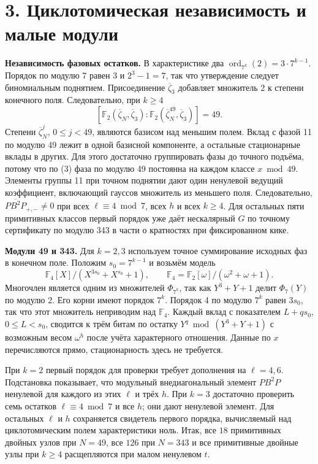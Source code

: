 \documentclass[11pt,a4paper]{article}
\newcommand{\sect}[1]{\section*{\sffamily\color{ink}#1}}
\newcommand{\subt}[1]{\par\medskip\noindent\textbf{#1.}\quad}
\newcommand{\ord}{\operatorname{ord}}
\begin{document}
\newpage
\sect{3. Циклотомическая независимость и малые модули}
\subt{Независимость фазовых остатков}
В характеристике два \(\ord_{7^k}(2)=3\cdot7^{k-1}\). Порядок по модулю 7 равен 3 и \(2^3-1=7\), так что утверждение следует биномиальным поднятием. Присоединение \(\overline\zeta_3\) добавляет множитель 2 к степени конечного поля. Следовательно, при \(k\ge4\)
\[
  [\mathbb F_2(\overline\zeta_N,\overline\zeta_3):
       \mathbb F_2(\overline\zeta_N^{49},\overline\zeta_3)]=49 .
\]
Степени \(\overline\zeta_N^j\), \(0\le j<49\), являются базисом над меньшим полем. Вклад с фазой 11 по модулю 49 лежит в одной базисной компоненте, а остальные стационарные вклады в других. Для этого достаточно группировать фазы до точного подъёма, потому что по (3) фаза по модулю 49 постоянна на каждом классе \(x\bmod49\). Элементы группы 11 при точном поднятии дают один ненулевой ведущий коэффициент, включающий гауссов множитель из меньшего поля. Следовательно, \(\overline{PB^2P}_{+,-}\ne0\) при всех \(\ell\equiv4\bmod7\), всех \(h\) и всех \(k\ge4\). Для остальных пяти примитивных классов первый порядок уже даёт нескалярный \(G\) по точному сертификату по модулю 343 в части о кратностях при фиксированном кике.

\subt{Модули 49 и 343}
Для \(k=2,3\) используем точное суммирование исходных фаз в конечном поле. Положим \(s_0=7^{k-1}\) и возьмём модель
\[
  \mathbb F_4[X]/(X^{3s_0}+X^{s_0}+1),\qquad
  \mathbb F_4=\mathbb F_2[\omega]/(\omega^2+\omega+1).
\]
Многочлен является одним из множителей \(\Phi_{7^k}\), так как \(Y^3+Y+1\) делит \(\Phi_7(Y)\) по модулю 2. Его корни имеют порядок \(7^k\). Порядок 4 по модулю \(7^k\) равен \(3s_0\), так что этот множитель неприводим над \(\mathbb F_4\). Каждый вклад с показателем \(L+q s_0\), \(0\le L<s_0\), сводится к трём битам по остатку \(Y^q\bmod(Y^3+Y+1)\) с возможным весом \(\omega^h\) после учёта характерного отношения. Данные по \(x\) перечисляются прямо, стационарность здесь не требуется.

При \(k=2\) первый порядок для проверки требует дополнения на \(\ell=4,6\). Подстановка показывает, что модульный внедиагональный элемент \(PB^2P\) ненулевой для каждого из этих \(\ell\) и трёх \(h\). При \(k=3\) достаточно проверить семь остатков \(\ell\equiv4\bmod7\) и все \(h\); они дают ненулевой элемент. Для остальных \(\ell\) и \(h\) сохраняется свидетель первого порядка, вычисляемый над циклотомическим полем характеристики ноль. Итак, все \(18\) примитивных двойных узлов при \(N=49\), все \(126\) при \(N=343\) и все примитивные двойные узлы при \(k\ge4\) расщепляются при малом ненулевом \(t\).
\end{document}
